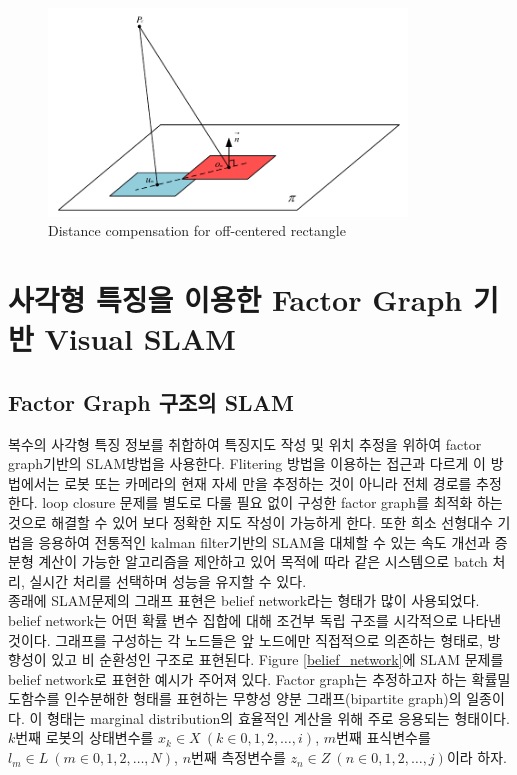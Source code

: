 \documentclass[master,korean,final]{cbnu-ecs}
\begin{document}
\begin{figure}[!ht]
  \centering
	\includegraphics[width=360px]{img/depth_compensate_cropped.pdf}
  \caption{Distance compensation for off-centered rectangle}
\label{depth_compensate}
\end{figure}

\chapter{사각형 특징을 이용한 Factor Graph 기반 Visual SLAM}
\section{Factor Graph 구조의 SLAM}
복수의 사각형 특징 정보를 취합하여 특징지도 작성 및 위치 추정을 위하여 factor graph기반의 SLAM방법을 사용한다. Flitering 방법을 이용하는 접근과 다르게 이 방법에서는 로봇 또는 카메라의 현재 자세 만을 추정하는 것이 아니라 전체 경로를 추정한다. loop closure 문제를 별도로 다룰 필요 없이 구성한 factor graph를 최적화 하는 것으로 해결할 수 있어 보다 정확한 지도 작성이 가능하게 한다. 또한 희소 선형대수 기법을 응용하여 전통적인 kalman filter기반의 SLAM을 대체할 수 있는 속도 개선과 증분형 계산이 가능한 알고리즘을 제안하고 있어 목적에 따라 같은 시스템으로 batch 처리, 실시간 처리를 선택하며 성능을 유지할 수 있다\cite{Dellaert2006, Kaess2007, Kaess2011}.\\
종래에 SLAM문제의 그래프 표현은 belief network라는 형태가 많이 사용되었다. belief network는 어떤 확률 변수 집합에 대해 조건부 독립 구조를 시각적으로 나타낸 것이다. 그래프를 구성하는 각 노드들은 앞 노드에만 직접적으로 의존하는 형태로, 방향성이 있고 비 순환성인 구조로 표현된다. Figure \ref{belief_network}에 SLAM 문제를 belief network로 표현한 예시가 주어져 있다. Factor graph는 추정하고자 하는 확률밀도함수를 인수분해한 형태를 표현하는 무향성 양분 그래프(bipartite graph)의 일종이다. 이 형태는 marginal distribution의 효율적인 계산을 위해 주로 응용되는 형태이다. 
$k$번째 로봇의 상태변수를 $x_k\in X \ (k\in{0,1,2,\dots,i})$, $m$번째 표식변수를 $l_m\in L \ (m\in{0,1,2,\dots,N})$, $n$번째 측정변수를 $z_n\in Z \ (n\in{0,1,2,\dots,j})$이라 하자. 
\end{document}
